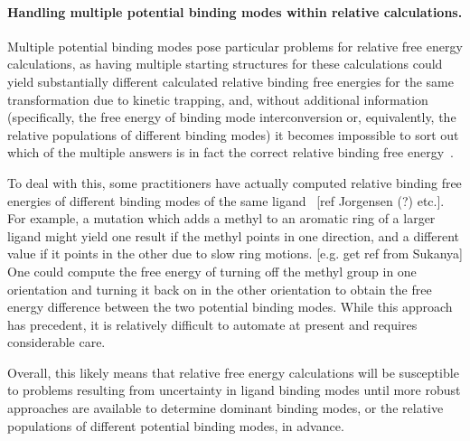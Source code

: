 \documentclass[9pt,bestpractices]{livecoms}
\begin{document}
\paragraph{Handling multiple potential binding modes within relative calculations.}

Multiple potential binding modes pose particular problems for relative free energy calculations, as having multiple starting structures for these calculations could yield substantially different calculated relative binding free energies for the same transformation due to kinetic trapping, and, without additional information (specifically, the free energy of binding mode interconversion or, equivalently, the relative populations of different binding modes) it becomes impossible to sort out which of the multiple answers is in fact the correct relative binding free energy~\cite{}.

To deal with this, some practitioners have actually computed relative binding free energies of different binding modes of the same ligand~\cite{palma2012computation} [ref Jorgensen (?) etc.].
For example, a mutation which adds a methyl to an aromatic ring of a larger ligand might yield one result if the methyl points in one direction, and a different value if it points in the other due to slow ring motions. [e.g. get ref from Sukanya]
One could compute the free energy of turning off the methyl group in one orientation and turning it back on in the other orientation to obtain the free energy difference between the two potential binding modes.
While this approach has precedent, it is relatively difficult to automate at present and requires considerable care.

Overall, this likely means that relative free energy calculations will be susceptible to problems resulting from uncertainty in ligand binding modes until more robust approaches are available to determine dominant binding modes, or the relative populations of different potential binding modes, in advance.
\end{document}
